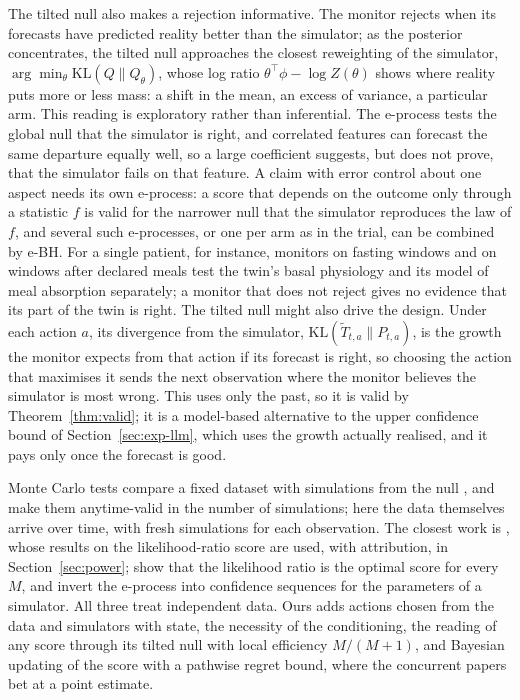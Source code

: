 \documentclass[12pt]{article}
\newcommand{\KL}{\mathrm{KL}}
\theoremstyle{remark}
\begin{document}
The tilted null also makes a rejection informative. The monitor rejects when its forecasts have predicted reality better than the simulator; as the posterior concentrates, the tilted null approaches the closest reweighting of the simulator, $\arg\min_\theta \KL(Q\|Q_\theta)$, whose log ratio $\theta^\top\phi - \log Z(\theta)$ shows where reality puts more or less mass: a shift in the mean, an excess of variance, a particular arm. This reading is exploratory rather than inferential. The e-process tests
the global null that the simulator is right, and correlated features can
forecast the same departure equally well, so a large coefficient suggests, but
does not prove, that the simulator fails on that feature. A claim with error
control about one aspect needs its own e-process: a score that depends on the
outcome only through a statistic $f$ is valid for the narrower null that the
simulator reproduces the law of $f$, and several such e-processes, or one per
arm as in the trial, can be combined by e-BH. For a single patient, for instance, monitors on fasting windows and on windows
after declared meals test the twin's basal physiology and its model of meal
absorption separately; a monitor that does not reject gives no evidence that
its part of the twin is right.
The tilted null might also drive the design. Under each action $a$, its
divergence from the simulator, $\KL(\tilde T_{t,a}\|P_{t,a})$, is the growth
the monitor expects from that action if its forecast is right, so choosing the
action that maximises it sends the next observation where the monitor believes
the simulator is most wrong. This uses only the past, so it is valid by
Theorem~\ref{thm:valid}; it is a model-based alternative to the upper
confidence bound of Section~\ref{sec:exp-llm}, which uses the growth actually
realised, and it pays only once the forecast is good.

Monte Carlo tests compare a fixed dataset with simulations from the null
\citep{besag1989generalized}, and \citet{fischer2024sequential} make them
anytime-valid in the number of simulations; here the data themselves arrive
over time, with fresh simulations for each observation. The closest work is
\citet{dombowsky2026besag}, whose results on the likelihood-ratio score are
used, with attribution, in Section~\ref{sec:power}; \citet{forre2026anytime}
show that the likelihood ratio is the optimal score for every $M$, and
\citet{cortinovis2026slice} invert the e-process into confidence sequences for
the parameters of a simulator. All three treat independent data. Ours adds actions chosen from the data and simulators with state, the necessity of the conditioning, the reading of any score through its tilted null with local efficiency $M/(M+1)$, and Bayesian updating of the score with a pathwise regret bound, where the concurrent papers bet at a point estimate.
\end{document}
